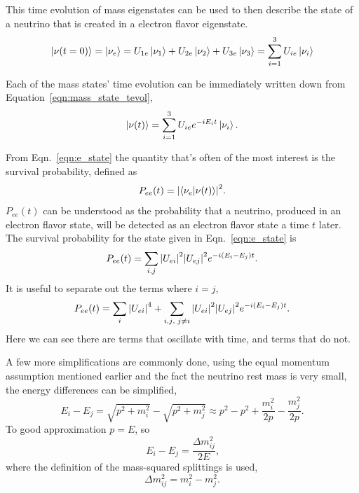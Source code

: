This time evolution of mass eigenstates can be used to then describe the state
of a neutrino that is created in a electron flavor eigenstate.
\begin{equation}
\ket{\nu(t=0)} = \ket{\nu_{e}} = U_{1e}\ket{\nu_1} + U_{2e}\ket{\nu_{2}} + U_{3e}\ket{\nu_{3}}
    =\sum_{i=1}^{3}U_{ie}\ket{\nu_{i}}
\end{equation}

Each of the mass states' time evolution can be immediately written down from
Equation~\eqref{eqn:mass_state_tevol},
\begin{equation}
    \ket{\nu(t)} = \sum_{i=1}^{3} U_{ie}e^{-iE_{i}t}\ket{\nu_{i}}\text{.}
    \label{eqn:e_state}
\end{equation}

From Eqn.~\eqref{eqn:e_state} the quantity that's often of the most interest
is the survival probability, defined as
\begin{equation}
    P_{ee}(t) = \abs{\braket{\nu_{e}}{\nu(t)}}^{2}\text{.}
\end{equation}
$P_{ee}(t)$ can be understood as the probability that a neutrino, produced in
an electron flavor state, will be detected as an electron flavor state a time
$t$ later.
The survival probability for the state given in Eqn.~\eqref{eqn:e_state} is
\begin{equation}
    P_{ee}(t) = \sum_{i,j}\abs{U_{ei}}^2\abs{U_{ej}}^2e^{-i(E_{i} - E_{j})t}\text{.}
\end{equation}
It is useful to separate out the terms where $i=j$,
\begin{equation}
    P_{ee}(t) = \sum_{i}\abs{U_{ei}}^4 + \sum_{i,j\text{, }j \ne i}
    \abs{U_{ei}}^2\abs{U_{ej}}^2e^{-i(E_{i} - E_{j})t}\text{.}
\end{equation}
Here we can see there are terms that oscillate with time, and terms that do
not.

A few more simplifications are commonly done, using the equal momentum
assumption mentioned earlier and the fact the neutrino rest mass is
very small, the energy differences can be simplified,
\begin{equation}
    E_{i} - E_{j} = \sqrt{p^{2} + m_{i}^{2}} - \sqrt{p^{2} + m_{j}^{2}} \approx
    p^{2} - p^{2} + \frac{m_{i}^2}{2p} - \frac{m_{j}^2}{2p}\text{.}
\end{equation}
To good approximation $p=E$, so
\begin{equation}
    E_{i} - E_{j} = \frac{\Delta m^{2}_{ij}}{2E}\text{,}
\end{equation}
where the definition of the mass-squared splittings is used,
\begin{equation}
    \Delta m^{2}_{ij} = m^{2}_{i} - m^{2}_{j}\text{.}
\end{equation}

